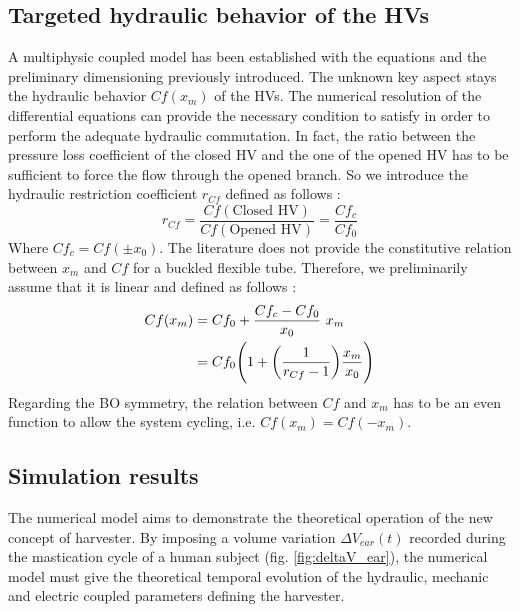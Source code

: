 \documentclass[3p,twocolumn,preprint]{elsarticle}
\begin{document}
	\subsection{Targeted hydraulic behavior of the HVs}	
	\label{subsec:HV hydraulic targeted behavior}
A multiphysic coupled model has been established with the equations and the preliminary dimensioning previously introduced. The unknown key aspect stays the hydraulic behavior $Cf(x_m)$ of the HVs. The numerical resolution of the differential equations can provide the necessary condition to satisfy in order to perform the adequate hydraulic commutation. In fact, the ratio between the pressure loss coefficient of the closed HV and the one of the opened HV has to be sufficient to force the flow through the opened branch. So we introduce the hydraulic restriction coefficient $r_{Cf}$ defined as follows :
\begin{equation}
	r_{Cf} = \dfrac{Cf(\text{Closed HV})}{Cf(\text{Opened HV})}	= \dfrac{Cf_c}{Cf_0}	
	\label{eq:r_Cf_definition}
\end{equation}
Where $Cf_c=Cf(\pm x_0)$. The literature does not provide the constitutive relation between $x_m$ and $Cf$ for a buckled flexible tube. Therefore, we preliminarily assume that it is linear and defined as follows :
\begin{align}
	Cf(x_m) & = Cf_0 + \dfrac{Cf_c - Cf_0}{x_0}\ x_m  \notag \\
			& = Cf_0 \Biggl( 1 + \biggl(\dfrac{1}{r_{Cf}-1} \biggr)\dfrac{x_m}{x_0} \Biggr)
			\label{eq:Cf(x_m)_linear}
\end{align}
Regarding the BO symmetry, the relation between $Cf$ and $x_m$ has to be an even function to allow the system cycling, i.e. $Cf(x_m) = Cf(-x_m)$.

	\subsection{Simulation results}	
	\label{subsec:Simulation results}
The numerical model aims to demonstrate the theoretical operation of the new concept of harvester. By imposing a volume variation $\Delta V_{ear}(t)$ recorded during the mastication cycle of a human subject (fig. \ref{fig:deltaV_ear}), the numerical model must give the theoretical temporal evolution of the hydraulic, mechanic and electric coupled parameters defining the harvester. 
\end{document}
